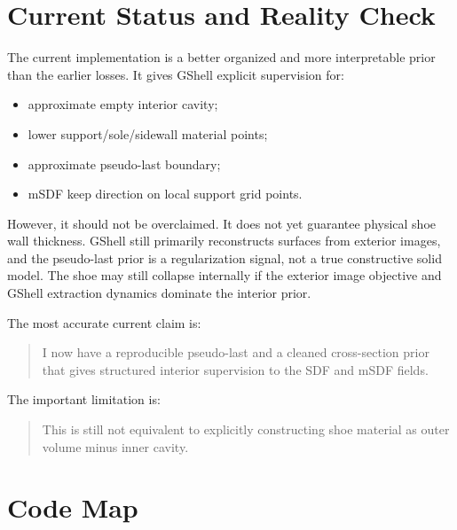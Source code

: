 \documentclass[11pt]{article}
\begin{document}
\section{Current Status and Reality Check}

The current implementation is a better organized and more interpretable prior
than the earlier losses.  It gives GShell explicit supervision for:
\begin{itemize}
    \item approximate empty interior cavity;
    \item lower support/sole/sidewall material points;
    \item approximate pseudo-last boundary;
    \item mSDF keep direction on local support grid points.
\end{itemize}

However, it should not be overclaimed.  It does not yet guarantee physical shoe
wall thickness.  GShell still primarily reconstructs surfaces from exterior
images, and the pseudo-last prior is a regularization signal, not a true
constructive solid model.  The shoe may still collapse internally if the
exterior image objective and GShell extraction dynamics dominate the interior
prior.

The most accurate current claim is:
\begin{quote}
I now have a reproducible pseudo-last and a cleaned cross-section prior that
gives structured interior supervision to the SDF and mSDF fields.
\end{quote}

The important limitation is:
\begin{quote}
This is still not equivalent to explicitly constructing shoe material as outer
volume minus inner cavity.
\end{quote}

\section{Code Map}
\end{document}
